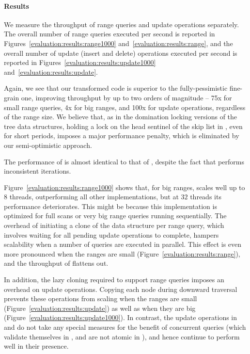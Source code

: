 \paragraph{Results}
We measure the throughput of range queries and update operations separately.
The overall number of range queries executed per second is reported
in Figures~\ref{evaluation:results:range1000}
and~\ref{evaluation:results:range}, and the overall number of update (insert
and delete) operations executed per second is reported in
Figures~\ref{evaluation:results:update1000} and~\ref{evaluation:results:update}.

Again, we see that our transformed code
 is superior to the fully-pessimistic fine-grain one, improving throughput by
up to two orders of magnitude -- 75x for small range queries, 4x for big
ranges, and 100x for update operations, regardless of the range size. We believe that,
as in the
domination locking versions of the tree data structures, holding a lock on the head sentinel of the skip list in
\domSkiplist, even for short periods, imposes a major performance penalty,
which is eliminated by our  semi-optimistic approach.

The performance of \autoSkiplist is almost
identical to that of \skiplist, despite the fact that \skiplist performs inconsistent iterations.

Figure~\ref{evaluation:results:range1000}
shows that, for big ranges, \bronson scales well up to $8$ threads, outperforming
all other implementations, but at $32$ threads its performance deteriorates.
This might be because this implementation is
optimized for full scans or very big range queries running sequentially.
The overhead of initiating a clone of the data structure per range query, which
involves waiting for all
pending update operations to complete, hampers scalability when
a number of queries are executed in parallel. This effect is even more pronounced when the
ranges are small (Figure~\ref{evaluation:results:range}), and the throughput of
\bronson flattens out.

In addition, the lazy cloning required to support
range queries imposes an overhead on  update operations. Copying each node
during downward traversal prevents these operations from scaling when
the ranges are small (Figure~\ref{evaluation:results:update}) as well as when
they are big (Figure~\ref{evaluation:results:update1000}). In contrast,
the update operations in \autoSkiplist and \skiplist do not take any special
measures for the benefit of concurrent queries (which validate themselves in
\autoSkiplist, and are not atomic in \skiplist), and hence continue to perform well in
their presence.
